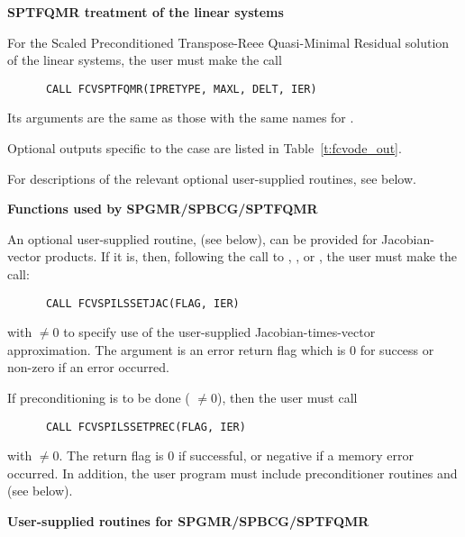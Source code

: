 \begin{Steps}
  
  {\s}{\p} {\bf SPTFQMR treatment of the linear systems}
  
  For the Scaled Preconditioned Transpose-Reee Quasi-Minimal Residual solution 
  of the linear systems, the user must make the call
\begin{verbatim}
      CALL FCVSPTFQMR(IPRETYPE, MAXL, DELT, IER)
\end{verbatim}
  Its arguments are the same as those with the same names for .

  Optional outputs specific to the {\sptfqmr} case are listed in
  Table~\ref{t:fcvode_out}.

  For descriptions of the relevant optional user-supplied routines, see below.
  

  {\s}{\p} {\bf Functions used by SPGMR/SPBCG/SPTFQMR}

  An optional user-supplied routine,  (see below), can be provided for
  Jacobian-vector products.  If it is, then, following the call to
  , , or , the user must make the call:
\begin{verbatim}
      CALL FCVSPILSSETJAC(FLAG, IER)
\end{verbatim}
  with  $\neq 0$ to specify use of the user-supplied
  Jacobian-times-vector approximation.
  The argument  is an error return flag which is $0$ 
  for success or non-zero if an error occurred.
  
  If preconditioning is to be done ( $\neq 0$), then the user must call
\begin{verbatim}
      CALL FCVSPILSSETPREC(FLAG, IER)
\end{verbatim}
  with  $\neq 0$.  The return flag  is 0 if
  successful, or negative if a memory error occurred.
  In addition, the user program must include
  preconditioner routines  and  (see below).


 {\s}{\p} {\bf User-supplied routines for SPGMR/SPBCG/SPTFQMR}


\end{Steps}
